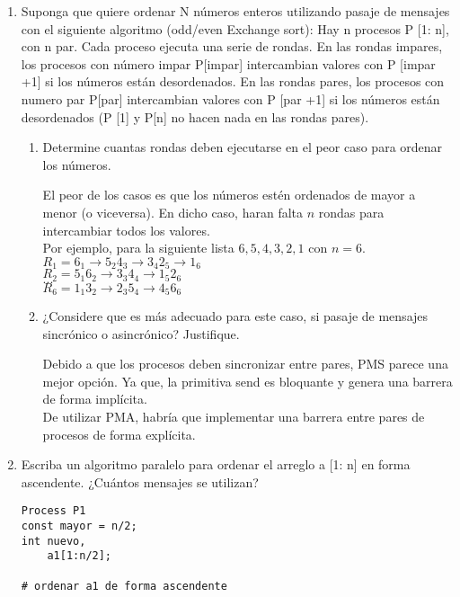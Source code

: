 \documentclass[a4paper, 10pt]{article}
\newenvironment{QandA}{
    \begin{enumerate}\bfseries}
    {\end{enumerate}
}
\newenvironment{answered}{\par\normalfont}{}
\begin{document}
\begin{QandA}
\item Suponga que quiere ordenar N números enteros utilizando pasaje de mensajes con el siguiente algoritmo (odd/even Exchange sort): Hay  n procesos P [1: n], con n par. Cada proceso ejecuta una serie de rondas. En las rondas impares, los procesos con número impar P[impar] intercambian valores con P [impar +1] si los números están desordenados. En las rondas pares, los procesos con numero par P[par] intercambian valores con P [par +1] si los números están desordenados (P [1] y P[n] no hacen nada en las rondas pares).
\begin{enumerate}
\item Determine cuantas rondas deben ejecutarse en el peor caso para ordenar los números.
\begin{answered}
El peor de los casos es que los números estén ordenados de mayor a menor (o viceversa). En dicho caso, haran falta $n$ rondas para intercambiar todos los valores.
\\
Por ejemplo, para la siguiente lista ${6,5,4,3,2,1}$ con $n=6$.
\\
$R_1 = 6_1 \rightarrow 5_2 4_3 \rightarrow 3_4 2_5 \rightarrow 1_6$
\\
$R_2 = 5_1 6_2 \rightarrow 3_3 4_4 \rightarrow 1_5 2_6$
\\
$...$
\\
$R_6 = 1_1 3_2 \rightarrow 2_3 5_4 \rightarrow 4_5 6_6$
\end{answered}
\item ¿Considere que es más adecuado para este caso, si pasaje de mensajes sincrónico o asincrónico? Justifique.
\begin{answered}
Debido a que los procesos deben sincronizar entre pares, PMS parece una mejor opción. Ya que, la primitiva send es bloquante y genera una barrera de forma implícita.
\\
De utilizar PMA, habría que implementar una barrera entre pares de procesos de forma explícita.
\end{answered}
\end{enumerate}
\item Escriba un algoritmo paralelo para ordenar el arreglo a [1: n] en forma ascendente. ¿Cuántos mensajes se utilizan? 
\begin{answered}
\begin{minipage}[t]{.5\linewidth}
\begin{lstlisting}
Process P1
const mayor = n/2;
int nuevo,
    a1[1:n/2];

# ordenar a1 de forma ascendente


\end{lstlisting}
\end{minipage}
\end{answered}
\end{QandA}
\end{document}

